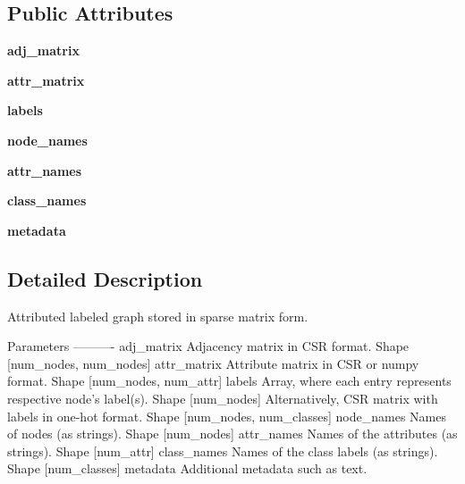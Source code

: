 \subsection*{Public Attributes}
\begin{DoxyCompactItemize}
\item 
\mbox{\label{classppnp_1_1data_1_1sparsegraph_1_1SparseGraph_aecd6cb171d71b8762432deab93aff25c}} 
{\bfseries adj\+\_\+matrix}
\item 
\mbox{\label{classppnp_1_1data_1_1sparsegraph_1_1SparseGraph_a86e229d514b2535058250ad2f649de84}} 
{\bfseries attr\+\_\+matrix}
\item 
\mbox{\label{classppnp_1_1data_1_1sparsegraph_1_1SparseGraph_a2375056bd4db29c34db41e3dcfa3a719}} 
{\bfseries labels}
\item 
\mbox{\label{classppnp_1_1data_1_1sparsegraph_1_1SparseGraph_ab5f351c3175de114ae5f2e53599294a8}} 
{\bfseries node\+\_\+names}
\item 
\mbox{\label{classppnp_1_1data_1_1sparsegraph_1_1SparseGraph_aeef37cd5600129f20b36cb2ce1f7860b}} 
{\bfseries attr\+\_\+names}
\item 
\mbox{\label{classppnp_1_1data_1_1sparsegraph_1_1SparseGraph_ab0dd5353a431169f0aee587a2faaa7bd}} 
{\bfseries class\+\_\+names}
\item 
\mbox{\label{classppnp_1_1data_1_1sparsegraph_1_1SparseGraph_ade6005219326ed16fe791541429b0afe}} 
{\bfseries metadata}
\end{DoxyCompactItemize}


\subsection{Detailed Description}
\begin{DoxyVerb}Attributed labeled graph stored in sparse matrix form.

Parameters
----------
adj_matrix
    Adjacency matrix in CSR format. Shape [num_nodes, num_nodes]
attr_matrix
    Attribute matrix in CSR or numpy format. Shape [num_nodes, num_attr]
labels
    Array, where each entry represents respective node's label(s). Shape [num_nodes]
    Alternatively, CSR matrix with labels in one-hot format. Shape [num_nodes, num_classes]
node_names
    Names of nodes (as strings). Shape [num_nodes]
attr_names
    Names of the attributes (as strings). Shape [num_attr]
class_names
    Names of the class labels (as strings). Shape [num_classes]
metadata
    Additional metadata such as text.\end{DoxyVerb}
 

